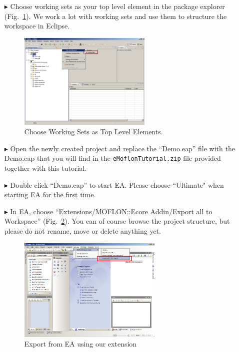 \begin{enumerate}
\item[$\blacktriangleright$] Choose working sets as your top level element in
the package explorer (Fig.~\ref{fig_eclipseWorkingsets}).
We work a lot with working sets and use them to structure the workspace in
Eclipse.
\begin{figure}[!h]
	\centering
  \includegraphics[width=0.6\textwidth]{pics/eclipse_workingsets.png}
	\caption{Choose Working Sets as Top Level Elements.}
	\label{fig_eclipseWorkingsets}
\end{figure}

\item[$\blacktriangleright$] Open the newly created project and replace the
``Demo.eap'' file with the Demo.eap that you will find in the
\texttt{eMoflonTutorial.zip} file provided together with this tutorial. 

\item[$\blacktriangleright$] Double click ``Demo.eap'' to start EA.
Please choose ``Ultimate" when starting EA for the first time.

\item[$\blacktriangleright$] In EA, choose ``Extensions/MOFLON::Ecore Addin/Export
all to Workspace'' (Fig.~\ref{fig_ea}).  You can of course browse the project
structure, but please do not rename, move or delete anything yet.
\begin{figure}[!h]
	\centering
  \includegraphics[width=0.65\textwidth]{pics/ea_firststart}
	\caption{Export from EA using our extension} 
	\label{fig_ea} 
\end{figure}


\end{enumerate}
